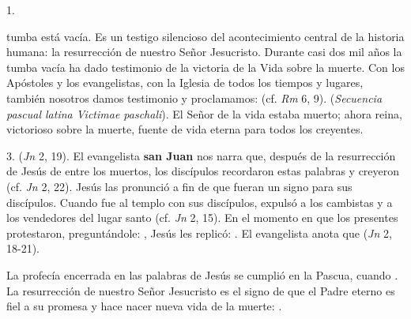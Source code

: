 \begin{body}
1. 

 tumba está vacía. Es un testigo silencioso del acontecimiento central de la historia humana: la resurrección de nuestro Señor Jesucristo. Durante casi dos mil años la tumba vacía ha dado testimonio de la victoria de la Vida sobre la muerte. Con los Apóstoles y los evangelistas, con la Iglesia de todos los tiempos y lugares, también nosotros damos testimonio y proclamamos:  (cf. \textit{Rm} 6, 9).  (\textit{Secuencia pascual latina Victimae paschali}). El Señor de la vida estaba muerto; ahora reina, victorioso sobre la muerte, fuente de vida eterna para todos los creyentes.

3.  (\textit{Jn} 2, 19). El evangelista \textbf{san Juan} nos narra que, después de la resurrección de Jesús de entre los muertos, los discípulos recordaron estas palabras y creyeron (cf. \textit{Jn} 2, 22). Jesús las pronunció a fin de que fueran un signo para sus discípulos. Cuando fue al templo con sus discípulos, expulsó a los cambistas y a los vendedores del lugar santo (cf. \textit{Jn} 2, 15). En el momento en que los presentes protestaron, preguntándole: , Jesús les replicó: . El evangelista anota que  (\textit{Jn} 2, 18-21).

La profecía encerrada en las palabras de Jesús se cumplió en la Pascua, cuando . La resurrección de nuestro Señor Jesucristo es el signo de que el Padre eterno es fiel a su promesa y hace nacer nueva vida de la muerte: .  


\end{body}
